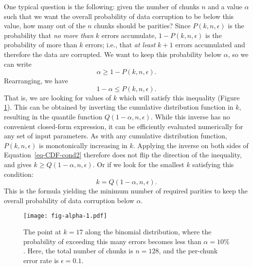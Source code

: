 \documentclass[a4paper,11pt]{article}
\begin{document}
One typical question is the following: given the number of chunks $n$ and a value $\alpha$ such that we want the overall probability of data corruption to be below this value, how many out of the $n$ chunks should be parities? Since $P(k, n, \epsilon)$ is the probability that \emph{no more than} $k$ errors accumulate, $1 - P(k, n, \epsilon)$ is the probability of more than $k$ errors; i.e., that \emph{at least} $k + 1$ errors accumulated and therefore the data are corrupted. We want to keep this probability below $\alpha$, so we can write
\begin{equation}
  \alpha \ge 1 - P(k, n, \epsilon) .
  \label{eq-CDF-cond}
\end{equation}
Rearranging, we have
\begin{equation}
  1 - \alpha \le P(k, n, \epsilon) .
  \label{eq-CDF-cond2}
\end{equation}
That is, we are looking for values of $k$ which will satisfy this inequality (Figure \ref{fig:alpha}). This can be obtained by inverting the cumulative distribution function in $k$, resulting in the quantile function $Q(1 - \alpha, n, \epsilon)$. While this inverse has no convenient closed-form expression, it can be efficiently evaluated numerically for any set of input parameters. As with any cumulative distribution function, $P(k, n, \epsilon)$ is monotonically increasing in $k$. Applying the inverse on both sides of Equation~\ref{eq-CDF-cond2} therefore does not flip the direction of the inequality, and gives $k \ge Q(1 - \alpha, n, \epsilon)$. Or if we look for the smallest $k$ satisfying this condition:
\begin{equation}
  k = Q(1 - \alpha, n, \epsilon) .
  \label{eq-quantile-sol-n}
\end{equation}
This is the formula yielding the minimum number of required parities to keep the overall probability of data corruption below $\alpha$.

\begin{figure}[!ht]
  \centering
  \texttt{[image: fig-alpha-1.pdf]}
  \caption{The point at $k=17$ along the binomial distribution, where the probability of exceeding this many errors becomes less than $\alpha = 10\%$. Here, the total number of chunks is $n = 128$, and the per-chunk error rate is $\epsilon = 0.1$.}
  \label{fig:alpha}
\end{figure}
\end{document}
